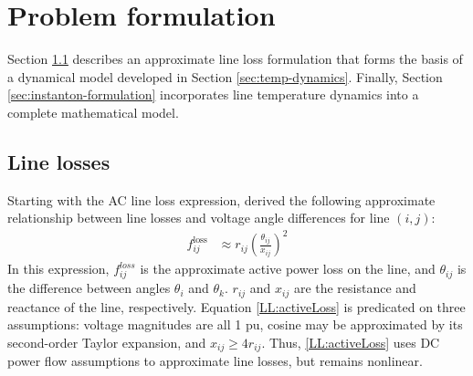 \documentclass[conference]{IEEEtran}
\begin{document}
\section{Problem formulation}\label{sec:problem}

Section \ref{sec:line-losses} describes an approximate line loss formulation that forms the basis of a dynamical model developed in Section \ref{sec:temp-dynamics}. Finally, Section \ref{sec:instanton-formulation} incorporates line temperature dynamics into a complete mathematical model.



\subsection{Line losses}\label{sec:line-losses}
Starting with the AC line loss expression, \cite{almassalkhi2014} derived the following approximate relationship between line losses and voltage angle differences for line $(i,j)$:
\begin{align}
\label{LL:activeLoss}
f_{ij}^{\text{loss}} &\approx r_{ij}\left(\frac{\theta_{ij}}{x_{ij}}\right)^2
\end{align}
In this expression, $f_{ij}^{loss}$ is the approximate active power loss on the line, and $\theta_{ij}$ is the difference between angles $\theta_i$ and $\theta_k$. $r_{ij}$ and $x_{ij}$ are the resistance and reactance of the line, respectively. Equation \eqref{LL:activeLoss} is predicated on three assumptions: voltage magnitudes are all 1 pu, cosine may be approximated by its second-order Taylor expansion, and $x_{ij} \geq 4r_{ij}$. Thus, \eqref{LL:activeLoss} uses DC power flow assumptions to approximate line losses, but remains nonlinear.
\end{document}
